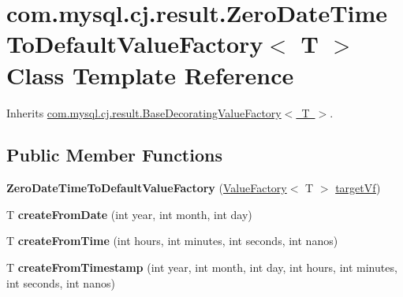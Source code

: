 \hypertarget{classcom_1_1mysql_1_1cj_1_1result_1_1_zero_date_time_to_default_value_factory}{}\section{com.\+mysql.\+cj.\+result.\+Zero\+Date\+Time\+To\+Default\+Value\+Factory$<$ T $>$ Class Template Reference}
\label{classcom_1_1mysql_1_1cj_1_1result_1_1_zero_date_time_to_default_value_factory}


Inherits \mbox{\hyperlink{classcom_1_1mysql_1_1cj_1_1result_1_1_base_decorating_value_factory}{com.\+mysql.\+cj.\+result.\+Base\+Decorating\+Value\+Factory$<$ T $>$}}.

\subsection*{Public Member Functions}
\begin{DoxyCompactItemize}
\item 
\mbox{\label{classcom_1_1mysql_1_1cj_1_1result_1_1_zero_date_time_to_default_value_factory_a760b32c06c80ba6719cee9aae77066b6}} 
{\bfseries Zero\+Date\+Time\+To\+Default\+Value\+Factory} (\mbox{\hyperlink{interfacecom_1_1mysql_1_1cj_1_1result_1_1_value_factory}{Value\+Factory}}$<$ T $>$ \mbox{\hyperlink{classcom_1_1mysql_1_1cj_1_1result_1_1_base_decorating_value_factory_a64c2c62bd9906ec3af7fc62e58bf34b3}{target\+Vf}})
\item 
\mbox{\label{classcom_1_1mysql_1_1cj_1_1result_1_1_zero_date_time_to_default_value_factory_ae629c81471dfdf02f153bb84afcba93e}} 
T {\bfseries create\+From\+Date} (int year, int month, int day)
\item 
\mbox{\label{classcom_1_1mysql_1_1cj_1_1result_1_1_zero_date_time_to_default_value_factory_a97adb0b51c3cf9d2bd908ea650f25f2d}} 
T {\bfseries create\+From\+Time} (int hours, int minutes, int seconds, int nanos)
\item 
\mbox{\label{classcom_1_1mysql_1_1cj_1_1result_1_1_zero_date_time_to_default_value_factory_a5b0935e9804d9f90a3fd09ce5bb78fc8}} 
T {\bfseries create\+From\+Timestamp} (int year, int month, int day, int hours, int minutes, int seconds, int nanos)
\end{DoxyCompactItemize}
